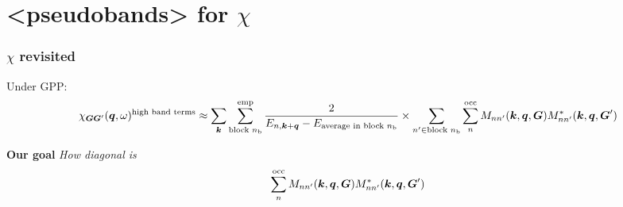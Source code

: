 \documentclass[t]{beamer}
\newcommand{\shortcode}[1]{\texttt{#1}}
\def\\{}%
\def\texttt#1{<#1>}%
\begin{document}
\section{\shortcode{pseudobands} for $\chi$}

\begin{frame}
\frametitle{$\chi$ revisited}

Under GPP:
\begin{equation}
    \begin{aligned}
        \chi_{\vb*{G} \vb*{G}'}(\vb*{q}, \omega)^{\text{high band terms}}
        \approx \sum_{\vb*{k}} \sum_{\text{block $n_{\text{b}}$}}^{\text{emp}} 
        \frac{
            2
        }{
            E_{n, \vb*{k} + \vb*{q}} - E_{\text{average in block $n_{\text{b}}$}} 
        } \\
        \times \sum_{n' \in \text{block $n_{\text{b}}$}} \sum_{n}^{\text{occ}} 
        M_{n n'} (\vb*{k}, \vb*{q}, \vb*{G}) M^*_{nn'} (\vb*{k}, \vb*{q}, \vb*{G}') 
    \end{aligned}
\end{equation}

\vspace{0.5cm}

\textbf{Our goal} \emph{How diagonal is}
\begin{equation}
    \sum_{n}^{\text{occ}} 
        M_{n n'} (\vb*{k}, \vb*{q}, \vb*{G}) M^*_{nn'} (\vb*{k}, \vb*{q}, \vb*{G}') 
\end{equation}

\end{frame}
\end{document}
